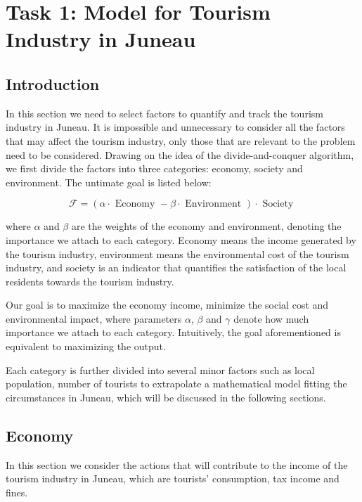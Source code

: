 \section{Task 1: Model for Tourism Industry in Juneau}

\subsection{Introduction}


In this section we need to select factors to quantify and track the tourism industry in Juneau. 
It is impossible and unnecessary to consider all the factors that may affect the 
tourism industry, only those that are relevant to the problem need to be considered.
Drawing on the idea of the divide-and-conquer algorithm, we first divide the factors 
into three categories: economy, society and environment. The untimate goal is listed below:


\begin{equation}
    \mathcal{F}=(\alpha \cdot \text { Economy }-\beta \cdot \text { Environment }) \cdot \text { Society }
\end{equation}

where $\alpha$ and $\beta$ are the weights of the economy and environment, denoting the importance we attach to each category.
Economy means the income generated by the tourism industry, environment means the environmental cost of the tourism industry, and 
society is an indicator that quantifies the satisfaction of the local residents towards the tourism industry.

Our goal is to maximize the economy income, minimize the social cost and environmental impact,
where parameters $\alpha$, $\beta$ and $\gamma$ denote how much importance we attach to each category.
Intuitively, the goal aforementioned is equivalent to maximizing the output.

Each category is further divided into several minor factors such as local population, 
number of tourists to extrapolate a mathematical model fitting the circumstances in Juneau,
which will be discussed in the following sections.





\subsection{Economy}

In this section we consider the actions that will contribute to the income of the tourism industry in Juneau, which are
tourists' consumption, tax income and fines.

